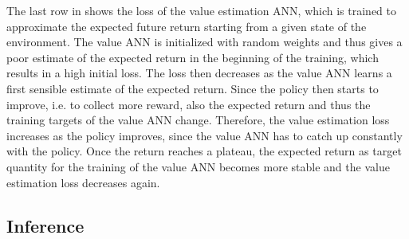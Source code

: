 The last row in  shows the loss of the value estimation ANN, which is trained to approximate the expected future return starting from a given state of the environment.
The value ANN is initialized with random weights and thus gives a poor estimate of the expected return in the beginning of the training, which results in a high initial loss.
The loss then decreases as the value ANN learns a first sensible estimate of the expected return.
Since the policy then starts to improve, i.e. to collect more reward, also the expected return and thus the training targets of the value ANN change.
Therefore, the value estimation loss increases as the policy improves, since the value ANN has to catch up constantly with the policy.
Once the return reaches a plateau, the expected return as target quantity for the training of the value ANN becomes more stable and the value estimation loss decreases again.


\subsection{Inference}
\label{sec:inference}

